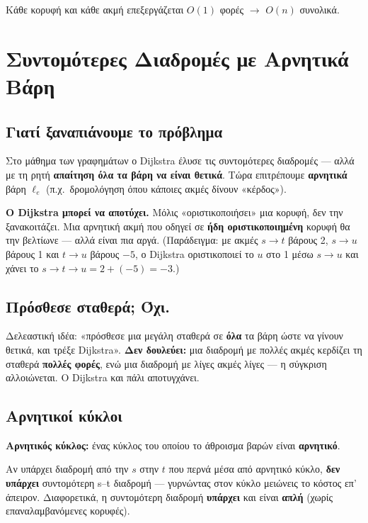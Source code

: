 \documentclass[11pt,a4paper]{article}
\begin{document}
Κάθε κορυφή και κάθε ακμή επεξεργάζεται $O(1)$ φορές $\to$ \textbf{$O(n)$}
συνολικά.

\section{Συντομότερες Διαδρομές με Αρνητικά Βάρη}

\subsection{Γιατί ξαναπιάνουμε το πρόβλημα}

Στο μάθημα των γραφημάτων ο Dijkstra έλυσε τις συντομότερες διαδρομές --- αλλά με
τη ρητή \textbf{απαίτηση όλα τα βάρη να είναι θετικά}. Τώρα επιτρέπουμε
\textbf{αρνητικά} βάρη $\ell_e$ (π.χ.\ δρομολόγηση όπου κάποιες ακμές δίνουν
«κέρδος»).

\begin{warningbox}
\textbf{Ο Dijkstra μπορεί να αποτύχει.} Μόλις «οριστικοποιήσει» μια κορυφή, δεν
την ξανακοιτάζει. Μια αρνητική ακμή που οδηγεί σε \textbf{ήδη οριστικοποιημένη}
κορυφή θα την βελτίωνε --- αλλά είναι πια αργά. (Παράδειγμα: με ακμές
$s \to t$ βάρους 2, $s \to u$ βάρους 1 και $t \to u$ βάρους $-5$, ο Dijkstra
οριστικοποιεί το $u$ στο 1 μέσω $s \to u$ και χάνει το
$s \to t \to u = 2 + (-5) = -3$.)
\end{warningbox}

\subsection{Πρόσθεσε σταθερά; Όχι.}

Δελεαστική ιδέα: «πρόσθεσε μια μεγάλη σταθερά σε \textbf{όλα} τα βάρη ώστε να
γίνουν θετικά, και τρέξε Dijkstra». \textbf{Δεν δουλεύει:} μια διαδρομή με
πολλές ακμές κερδίζει τη σταθερά \textbf{πολλές φορές}, ενώ μια διαδρομή με λίγες
ακμές λίγες --- η σύγκριση αλλοιώνεται. Ο Dijkstra και πάλι αποτυγχάνει.

\subsection{Αρνητικοί κύκλοι}

\begin{keypoint}
\textbf{Αρνητικός κύκλος:} ένας κύκλος του οποίου το άθροισμα βαρών είναι
\textbf{αρνητικό}.

Αν υπάρχει διαδρομή από την $s$ στην $t$ που περνά μέσα από αρνητικό κύκλο,
\textbf{δεν υπάρχει} συντομότερη s--t διαδρομή --- γυρνώντας στον κύκλο μειώνεις
το κόστος επ' άπειρον. Διαφορετικά, η συντομότερη διαδρομή \textbf{υπάρχει} και
είναι \textbf{απλή} (χωρίς επαναλαμβανόμενες κορυφές).
\end{keypoint}
\end{document}
